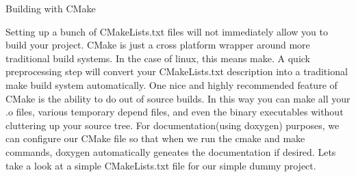 \documentclass[11pt,utf8]{article}
\begin{document}
Building with CMake

Setting up a bunch of CMakeLists.txt files will not immediately allow you to build your project. CMake is just a cross platform wrapper around more traditional build systems. In the case of linux, this means make. A quick preprocessing step will convert your CMakeLists.txt description into a traditional make build system automatically. One nice and highly recommended feature of CMake is the ability to do out of source builds. In this way you can make all your .o files, various temporary depend files, and even the binary executables without cluttering up your source tree.
For documentation(using doxygen) purposes, we can configure our CMake file so that when we run the cmake and make commands, doxygen automatically geneates the documentation if desired. Lets take a look at a simple CMakeLists.txt file for our simple dummy project.
\end{document}
